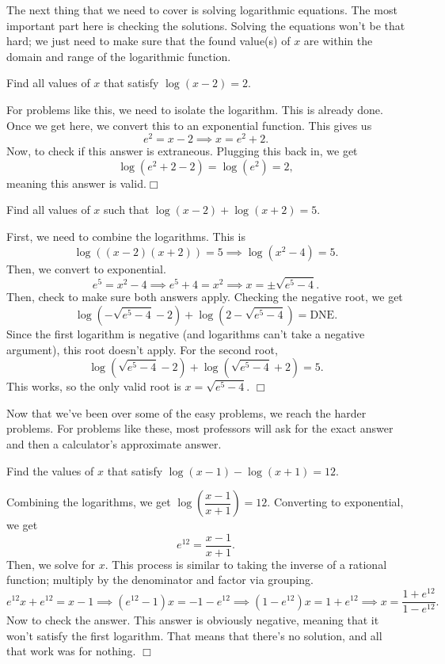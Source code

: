 \documentclass[../book.tex]{subfiles}
\begin{document}
The next thing that we need to cover is solving logarithmic equations.  The most important part here is checking the solutions.  Solving the equations won't be that hard; we just need to make sure that the found value(s) of $x$ are within the domain and range of the logarithmic function.
\begin{example}
Find all values of $x$ that satisfy $\log(x-2)=2$.
\end{example}
\begin{solution}
For problems like this, we need to isolate the logarithm.  This is already done.  Once we get here, we convert this to an exponential function.  This gives us $$e^2=x-2 \implies x=e^2+2.$$ 
Now, to check if this answer is extraneous.  Plugging this back in, we get $$\log(e^2+2-2)=\log(e^2)=2,$$ meaning this answer is valid.$\Box$
\end{solution}
\begin{example}
Find all values of $x$ such that $\log(x-2)+\log(x+2)=5$.
\end{example}
\begin{solution}
First, we need to combine the logarithms.  This is $$\log\left((x-2)(x+2)\right)=5 \implies \log(x^2-4)=5.$$  Then, we convert to exponential.  $$e^5=x^2-4 \implies e^5+4=x^2 \implies x=\pm\sqrt{e^5-4}.$$
Then, check to make sure both answers apply.  Checking the negative root, we get $$\log(-\sqrt{e^5-4}-2)+\log(2-\sqrt{e^5-4})=\text{DNE}.$$  Since the first logarithm is negative (and logarithms can't take a negative argument), this root doesn't apply.  For the second root, $$\log(\sqrt{e^5-4}-2)+\log(\sqrt{e^5-4}+2)=5.$$  This works, so the only valid root is $x=\sqrt{e^5-4}.$ $\Box$
\end{solution}
Now that we've been over some of the easy problems, we reach the harder problems.  For problems like these, most professors will ask for the exact answer and then a calculator's approximate answer.  
\begin{example}
Find the values of $x$ that satisfy $\log(x-1)-\log(x+1)=12$.
\end{example}
\begin{solution}
Combining the logarithms, we get $\log\left(\dfrac{x-1}{x+1}\right)=12.$  Converting to exponential, we get $$e^{12}=\dfrac{x-1}{x+1}.$$  Then, we solve for $x$.  This process is similar to taking the inverse of a rational function; multiply by the denominator and factor via grouping.
$$e^{12}x+e^{12}=x-1 \implies (e^{12}-1)x=-1-e^{12} \implies (1-e^{12})x=1+e^{12} \implies x=\dfrac{1+e^{12}}{1-e^{12}}.$$
Now to check the answer.  This answer is obviously negative, meaning that it won't satisfy the first logarithm.  That means that there's no solution, and all that work was for nothing. $\Box$
\end{solution}
\end{document}
